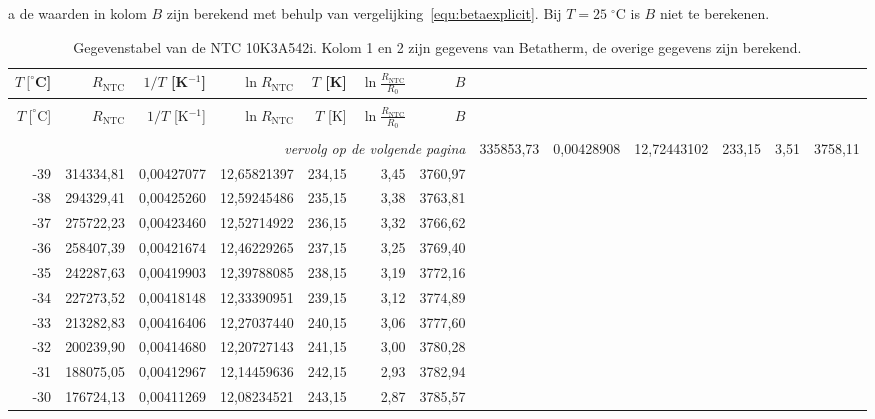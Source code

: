 \documentclass[12pt,a4paper,final,twoside,fleqn]{article}
\newcommand{\mathcelc}[1]{\mbox{$#1\;^\circ\text{C}$}}
\newcommand{\rntc}{R_\text{NTC}}
\newcommand{\ntctype}{10K3A542i}
\newcommand{\ntcman}{Betatherm}
\begin{document}
\begin{ThreePartTable}
\begin{TableNotes}
\footnotesize
\item [a] de waarden in kolom $B$ zijn berekend met behulp van vergelijking~\eqref{equ:betaexplicit}.
Bij $T=\mathcelc{25}$ is $B$ niet te berekenen.
\end{TableNotes}
\begin{longtable}{rrrrrrr}
\caption{Gegevenstabel van de NTC \ntctype. Kolom 1 en 2 zijn gegevens van \ntcman, de
overige gegevens zijn berekend.}\label{tab:specsntc} \\
$T\ [^\circ$C] & $\rntc$ & $1/T$ [K$^{-1}$]     & $\ln \rntc$ & $T$ [K] & $\ln\frac{\rntc}{R_0}$ & $B$ \\[0.3ex]
\hline \\[-2.0ex]
\endfirsthead
$T\ [^\circ$C] & $\rntc$ & $1/T$ [K$^{-1}$]     & $\ln \rntc$ & $T$ [K] & $\ln\frac{\rntc}{R_0}$ & $B$ \\[0.3ex]
\hline \\[-2.0ex]
\endhead
\hline \multicolumn{7}{r}{\small\sl{vervolg op de volgende pagina}}
\endfoot
\hline
\endlastfoot
-40          & 335853,73 & 0,00428908    & 12,72443102 & 233,15     & 3,51       & 3758,11 \\
-39          & 314334,81 & 0,00427077    & 12,65821397 & 234,15     & 3,45       & 3760,97 \\
-38          & 294329,41 & 0,00425260    & 12,59245486 & 235,15     & 3,38       & 3763,81 \\
-37          & 275722,23 & 0,00423460    & 12,52714922 & 236,15     & 3,32       & 3766,62 \\
-36          & 258407,39 & 0,00421674    & 12,46229265 & 237,15     & 3,25       & 3769,40 \\
-35          & 242287,63 & 0,00419903    & 12,39788085 & 238,15     & 3,19       & 3772,16 \\
-34          & 227273,52 & 0,00418148    & 12,33390951 & 239,15     & 3,12       & 3774,89 \\
-33          & 213282,83 & 0,00416406    & 12,27037440 & 240,15     & 3,06       & 3777,60 \\
-32          & 200239,90 & 0,00414680    & 12,20727143 & 241,15     & 3,00       & 3780,28 \\
-31          & 188075,05 & 0,00412967    & 12,14459636 & 242,15     & 2,93       & 3782,94 \\
-30          & 176724,13 & 0,00411269    & 12,08234521 & 243,15     & 2,87       & 3785,57 \\

\end{longtable}
\end{ThreePartTable}
\end{document}

